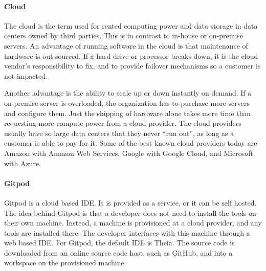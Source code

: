 \paragraph{Cloud}
The \gls{cloud} is the term used for rented computing power and data storage in data centers owned by third parties.
This is in contrast to in-house or on-premise servers.
An advantage of running software in the \gls{cloud} is that maintenance of hardware is out sourced.
If a hard drive or processor breaks down, it is the cloud vendor's responsibility to fix, and to provide failover mechanisms so a customer is not impacted.


Another advantage is the ability to scale up or down instantly on demand.
If a on-premise server is overloaded, the organization has to purchase more servers and configure them.
Just the shipping of hardware alone takes more time than requesting more compute power from a \gls{cloud} provider.
The cloud providers usually have so large data centers that they never ``run out'', as long as a customer is able to pay for it.
Some of the best known cloud providers today are Amazon with Amazon Web Services, Google with Google Cloud, and Microsoft with Azure.

\paragraph{Gitpod}
Gitpod is a \gls{cloud} based \acrfull{IDE}.
It is provided as a service, or it can be self hosted.
The idea behind \gls{Gitpod} is that a developer does not need to install the tools on their own machine.
Instead, a machine is provisioned at a cloud provider, and any tools are installed there.
The developer interfaces with this machine through a web based \acrshort{IDE}.
For Gitpod, the default \acrshort{IDE} is \gls{Theia}.
The source code is downloaded from an online source code host, such as \gls{GitHub}, and into a workspace on the provisioned machine. %
